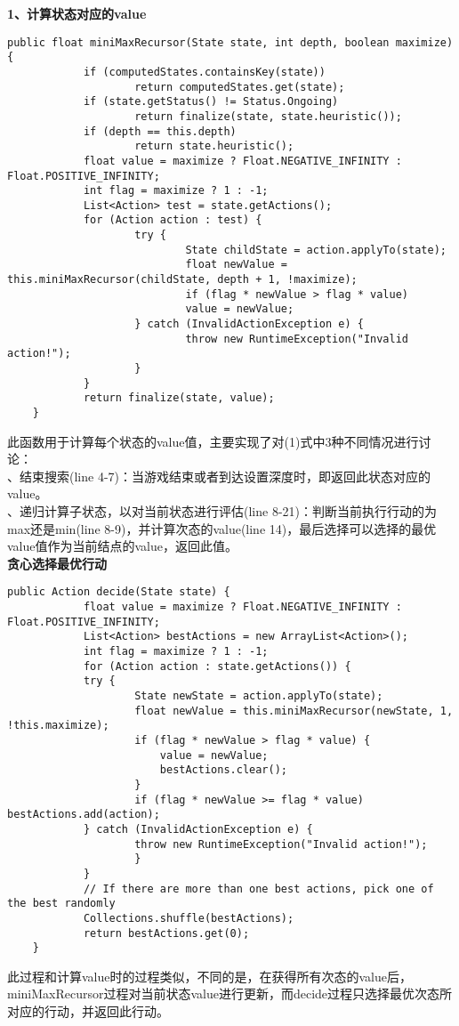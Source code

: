 \documentclass[UTF8]{article}
\begin{document}
	\indent\textbf{1、计算状态对应的value}
	\begin{lstlisting}[caption=计算每个状态对应的value]
	public float miniMaxRecursor(State state, int depth, boolean maximize) {
			if (computedStates.containsKey(state)) 
					return computedStates.get(state);
			if (state.getStatus() != Status.Ongoing)
					return finalize(state, state.heuristic());
			if (depth == this.depth)
					return state.heuristic();
			float value = maximize ? Float.NEGATIVE_INFINITY : Float.POSITIVE_INFINITY;
			int flag = maximize ? 1 : -1;
			List<Action> test = state.getActions();
			for (Action action : test) {
					try {
							State childState = action.applyTo(state);
							float newValue = this.miniMaxRecursor(childState, depth + 1, !maximize);
							if (flag * newValue > flag * value) 
							value = newValue;
					} catch (InvalidActionException e) {
							throw new RuntimeException("Invalid action!");
					}
			}
			return finalize(state, value);
	}
	\end{lstlisting}
	\indent 此函数用于计算每个状态的value值，主要实现了对(1)式中3种不同情况进行讨论：\\
	、结束搜索(line 4-7)：当游戏结束或者到达设置深度时，即返回此状态对应的value。\\
	、递归计算子状态，以对当前状态进行评估(line 8-21)：判断当前执行行动的为max还是min(line 8-9)，并计算次态的value(line 14)，最后选择可以选择的最优value值作为当前结点的value，返回此值。\\
	\indent\textbf{贪心选择最优行动}
	\begin{lstlisting}[caption=贪心选取最优行动]
	public Action decide(State state) {
			float value = maximize ? Float.NEGATIVE_INFINITY : Float.POSITIVE_INFINITY;
			List<Action> bestActions = new ArrayList<Action>();
			int flag = maximize ? 1 : -1;
			for (Action action : state.getActions()) {
			try {
					State newState = action.applyTo(state);
					float newValue = this.miniMaxRecursor(newState, 1, !this.maximize);
					if (flag * newValue > flag * value) {
						value = newValue;
						bestActions.clear();
					}
					if (flag * newValue >= flag * value) bestActions.add(action);
			} catch (InvalidActionException e) {
					throw new RuntimeException("Invalid action!");
					}
			}
			// If there are more than one best actions, pick one of the best randomly
			Collections.shuffle(bestActions);
			return bestActions.get(0);
	}
	\end{lstlisting}
	\indent 此过程和计算value时的过程类似，不同的是，在获得所有次态的value后，miniMaxRecursor过程对当前状态value进行更新，而decide过程只选择最优次态所对应的行动，并返回此行动。
	
\end{document}

